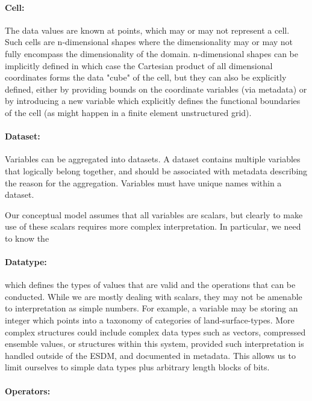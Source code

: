 \paragraph{Cell:}%
\label{cell}

The data values are known at points, which may or may not represent a
cell. Such cells are n-dimensional shapes where the dimensionality may
or may not fully encompass the dimensionality of the domain.
n-dimensional shapes can be implicitly defined in which case the
Cartesian product of all dimensional coordinates forms the data "cube"
of the cell, but they can also be explicitly defined, either by
providing bounds on the coordinate variables (via metadata) or by
introducing a new variable which explicitly defines the functional
boundaries of the cell (as might happen in a finite element unstructured
grid).

\paragraph{Dataset:}%
\label{dataset}

Variables can be aggregated into datasets. A dataset contains multiple
variables that logically belong together, and should be associated with
metadata describing the reason for the aggregation. Variables must have
unique names within a dataset.

Our conceptual model assumes that all variables are scalars, but clearly
to make use of these scalars requires more complex interpretation. In
particular, we need to know the

\paragraph{Datatype:}%
\label{datatype}

which defines the types of values that are valid and the operations that
can be conducted. While we are mostly dealing with scalars, they may not
be amenable to interpretation as simple numbers. For example, a variable
may be storing an integer which points into a taxonomy of categories of
land-surface-types. More complex structures could include complex data
types such as vectors, compressed ensemble values, or structures within
this system, provided such interpretation is handled outside of the
ESDM, and documented in metadata. This allows us to limit ourselves to
simple data types plus arbitrary length blocks of bits.

\paragraph{Operators:}%
\label{operators}


